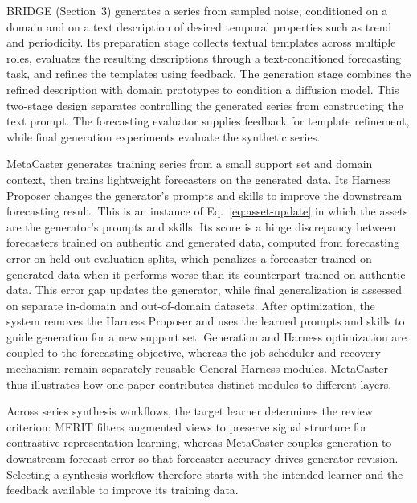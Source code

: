 \documentclass[preprints,article,submit,moreauthors]{Definitions/mdpi}
\begin{document}
BRIDGE \citep{bridge2025} (Section~3) generates a series from sampled noise, conditioned on a domain and on a text description of desired temporal properties such as trend and periodicity. Its preparation stage collects textual templates across multiple roles, evaluates the resulting descriptions through a text-conditioned forecasting task, and refines the templates using feedback. The generation stage combines the refined description with domain prototypes to condition a diffusion model. This two-stage design separates controlling the generated series from constructing the text prompt. The forecasting evaluator supplies feedback for template refinement, while final generation experiments evaluate the synthetic series.

MetaCaster \citep{metacaster2026} generates training series from a small support set and domain context, then trains lightweight forecasters on the generated data. Its Harness Proposer changes the generator's prompts and skills to improve the downstream forecasting result. This is an instance of Eq.~\eqref{eq:asset-update} in which the assets are the generator's prompts and skills. Its score is a hinge discrepancy between forecasters trained on authentic and generated data, computed from forecasting error on held-out evaluation splits, which penalizes a forecaster trained on generated data when it performs worse than its counterpart trained on authentic data. This error gap updates the generator, while final generalization is assessed on separate in-domain and out-of-domain datasets. After optimization, the system removes the Harness Proposer and uses the learned prompts and skills to guide generation for a new support set. Generation and Harness optimization are coupled to the forecasting objective, whereas the job scheduler and recovery mechanism remain separately reusable General Harness modules. MetaCaster thus illustrates how one paper contributes distinct modules to different layers.

Across series synthesis workflows, the target learner determines the review criterion: MERIT filters augmented views to preserve signal structure for contrastive representation learning, whereas MetaCaster couples generation to downstream forecast error so that forecaster accuracy drives generator revision. Selecting a synthesis workflow therefore starts with the intended learner and the feedback available to improve its training data.
\end{document}
